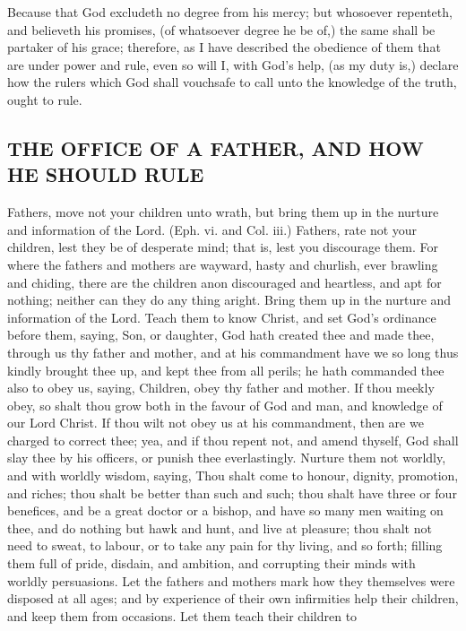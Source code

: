Because that God excludeth no degree from his 
mercy; but whosoever repenteth, and believeth his promises,
(of whatsoever degree he be of,) the same shall be 
partaker of his grace; therefore, as I have described the 
obedience of them that are under power and rule, even so 
will I, with God's help, (as my duty is,) declare how the 
rulers which God shall vouchsafe to call unto the knowledge
of the truth, ought to rule. 


\subsection*{THE OFFICE OF A FATHER, AND HOW HE SHOULD RULE}

Fathers, move not your children unto wrath, but 
bring them up in the nurture and information of the 
Lord. (Eph. vi. and Col. iii.) Fathers, rate not your 
children, lest they be of desperate mind; that is, lest you 
discourage them. For where the fathers and mothers are 
wayward, hasty and churlish, ever brawling and chiding, 
there are the children anon discouraged and heartless, and 
apt for nothing; neither can they do any thing aright. 
Bring them up in the nurture and information of the 
Lord. Teach them to know Christ, and set God's ordinance
before them, saying, Son, or daughter, God hath 
created thee and made thee, through us thy father and 
mother, and at his commandment have we so long thus
kindly brought thee up, and kept thee from all perils; he 
hath commanded thee also to obey us, saying, Children,
obey thy father and mother. If thou meekly obey, so 
shalt thou grow both in the favour of God and man, and 
knowledge of our Lord Christ. If thou wilt not obey us 
at his commandment, then are we charged to correct thee;
yea, and if thou repent not, and amend thyself, God shall 
slay thee by his officers, or punish thee everlastingly. 
Nurture them not worldly, and with worldly wisdom, 
saying, Thou shalt come to honour, dignity, promotion, 
and riches; thou shalt be better than such and such; thou 
shalt have three or four benefices, and be a great doctor or 
a bishop, and have so many men waiting on thee, and do 
nothing but hawk and hunt, and live at pleasure; thou 
shalt not need to sweat, to labour, or to take any pain for 
thy living, and so forth; filling them full of pride, disdain,
and ambition, and corrupting their minds with worldly 
persuasions. Let the fathers and mothers mark how they 
themselves were disposed at all ages; and by experience 
of their own infirmities help their children, and keep 
them from occasions. Let them teach their children to 

